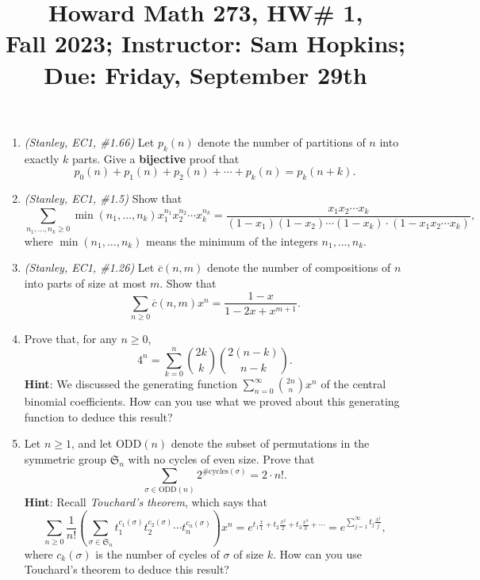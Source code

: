 \documentclass[11pt]{article}
\title{Howard Math 273, HW\# 1, \\ {\normalsize Fall 2023; Instructor: Sam Hopkins; Due: Friday, September 29th}}
\date{}
\begin{document}
\maketitle

\thispagestyle{empty}


\begin{enumerate}

\item \emph{(Stanley, EC1, \#1.66)} Let $p_k(n)$ denote the number of partitions of $n$ into exactly $k$ parts. Give a {\bf bijective} proof that
\[p_0(n)+p_1(n)+p_2(n)+\cdots + p_k(n) = p_k(n+k).\]

\item \emph{(Stanley, EC1, \#1.5)} Show that 
\[ \sum_{n_1,\ldots, n_k \geq 0} \min(n_1,\ldots,n_k) x_1^{n_1}x_2^{n_2}\cdots x_k^{n_k} = \frac{x_1x_2\cdots x_k}{(1-x_1)(1-x_2)\cdots(1-x_k) \cdot (1-x_1x_2\cdots x_k)}, \]
where $ \min(n_1,\ldots,n_k)$ means the minimum of the integers $n_1,\ldots,n_k$.

\item \emph{(Stanley, EC1, \#1.26)} Let $\overline{c}(n,m)$ denote the number of compositions of $n$ into parts of size at most $m$. Show that
\[ \sum_{n\geq 0} \overline{c}(n,m)x^n = \frac{1-x}{1-2x+x^{m+1}}.\]

\item Prove that, for any $n \geq 0$,
\[ 4^n = \sum_{k=0}^{n} \binom{2k}{k}\binom{2(n-k)}{n-k}. \]
{\bf Hint}: We discussed the generating function $\sum_{n=0}^{\infty} \binom{2n}{n}x^n$ of the central binomial coefficients. How can you use what we proved about this generating function to deduce this result?

\item Let $n \geq 1$, and let $\mathrm{ODD}(n)$ denote the subset of permutations in the symmetric group $\mathfrak{S}_n$ with no cycles of even size. Prove that
\[ \sum_{\sigma \in \mathrm{ODD}(n)} 2^{\#\mathrm{cycles}(\sigma)} = 2\cdot n!. \]
{\bf Hint}: Recall \emph{Touchard's theorem}, which says that
\[ \sum_{n \geq 0} \frac{1}{n!} \left(\sum_{\sigma\in \mathfrak{S}_n}t_1^{c_1(\sigma)} t_2^{c_2(\sigma)} \cdots t_n^{c_n(\sigma)} \right)  x^n = e^{t_1\frac{x}{1} + t_2\frac{x^2}{2} + t_3\frac{x^3}{3}+\cdots} = e^{\sum_{j=1}^{\infty} t_j\frac{x^j}{j}},\]
where $c_k(\sigma)$ is the number of cycles of $\sigma$ of size $k$. How can you use Touchard's theorem to deduce this result?


\end{enumerate}
\end{document}
